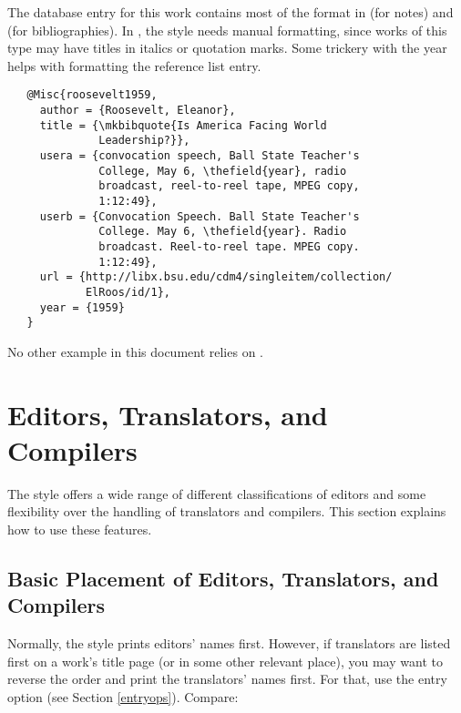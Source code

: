 \documentclass[11pt,letterpaper,oneside]{article}
\begin{document}
\begin{citebib}
\item \cite{roosevelt1959}
\end{citebib}

\noindent The database entry for this work contains most of the format
in  (for notes) and  (for
bibliographies). In , the style needs manual
formatting, since works of this type may have titles in italics or
quotation marks. Some trickery with the year helps with formatting the
reference list entry.

\begin{verbatim}
   @Misc{roosevelt1959,
     author = {Roosevelt, Eleanor},
     title = {\mkbibquote{Is America Facing World
              Leadership?}},
     usera = {convocation speech, Ball State Teacher's
              College, May 6, \thefield{year}, radio
              broadcast, reel-to-reel tape, MPEG copy,
              1:12:49},
     userb = {Convocation Speech. Ball State Teacher's
              College. May 6, \thefield{year}. Radio
              broadcast. Reel-to-reel tape. MPEG copy.
              1:12:49},
     url = {http://libx.bsu.edu/cdm4/singleitem/collection/
            ElRoos/id/1},
     year = {1959}
   }
\end{verbatim}

\noindent No other example in this document relies on .

\section{Editors, Translators, and Compilers}
\label{edtrans}

The style offers a wide range of different classifications of editors
and some flexibility over the handling of translators and compilers.
This section explains how to use these features.

\subsection{Basic Placement of Editors, Translators, and Compilers}
\label{edtranspos}

Normally, the style prints editors' names first. However, if
translators are listed first on a work's title page (or in some other
relevant place), you may want to reverse the order and print the
translators' names first. For that, use the entry option
 (see Section \ref{entryops}). Compare:
\end{document}
